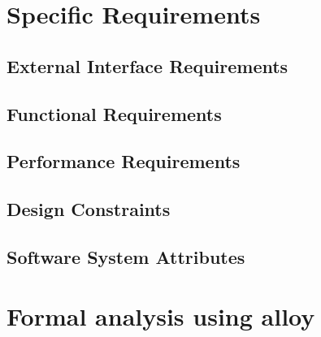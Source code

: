 \documentclass[a4paper,oneside,11pt]{article}
\begin{document}
    \newpage
    \section{Specific Requirements}
        \subsection{External Interface Requirements}
            
        \subsection{Functional Requirements}
            
        \subsection{Performance Requirements}
            
        \subsection{Design Constraints}
            
        \subsection{Software System Attributes}
            

    \section{Formal analysis using alloy}
        
            
\end{document}
